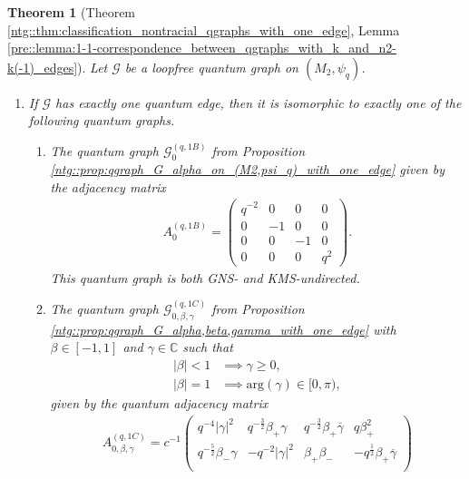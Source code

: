 \documentclass{amsart}
\newtheorem{thm}{Theorem}[section]
\newcommand{\C}{\mathbb{C}}
\begin{document}
\begin{thm}[Theorem \ref{ntg::thm:classification_nontracial_qgraphs_with_one_edge}, Lemma \ref{pre::lemma:1-1-correspondence_between_qgraphs_with_k_and_n2-k(-1)_edges}]
    Let $\mathcal{G}$ be a loopfree quantum graph on $(M_2, \psi_q)$.
    \begin{enumerate}
        \item If $\mathcal{G}$ has exactly one quantum edge, then it is isomorphic to exactly one of the following quantum graphs.
        \begin{enumerate}
            \item The quantum graph $\mathcal{G}_{0}^{(q,1B)}$ from Proposition \ref{ntg::prop:qgraph_G_alpha_on_(M2,psi_q)_with_one_edge} given by the adjacency matrix 
            \begin{align*}
                A_{0}^{(q,1B)} = \begin{pmatrix}
                    q^{-2} & 0 & 0 & 0 \\
                    0 & -1 & 0 & 0 \\
                    0 & 0 & -1 & 0 \\
                    0 & 0 & 0 & q^{2}
                \end{pmatrix}.
            \end{align*}
            This quantum graph is both GNS- and KMS-undirected.
            \item The quantum graph $\mathcal{G}_{0, \beta, \gamma}^{(q,1C)}$ from Proposition \ref{ntg::prop:qgraph_G_alpha,beta,gamma_with_one_edge} with $\beta \in [-1,1]$ and $\gamma \in \C$ such that  
            \begin{align*}
                |\beta| < 1 & \implies   \gamma \geq 0, \\
                |\beta| = 1 & \implies   \mathrm{arg}(\gamma) \in [0, \pi),
            \end{align*}
            given by the quantum adjacency matrix
            \begin{align*}
                A_{0, \beta, \gamma}^{(q,1C)} = c^{-1} \begin{pmatrix}
                    q^{-4} |\gamma|^2     & q^{-\frac{3}{2}} \beta_+ \gamma            & q^{-\frac{3}{2}}\beta_+ \overline{\gamma}              & q \beta_+^2            \\
                    q^{-\frac{5}{2}} \beta_- \gamma & - q^{-2} |\gamma|^2 & \beta_+ \beta_-                           & -q^{\frac{1}{2}}\beta_+ \overline{\gamma}   \\

\end{pmatrix}
\end{align*}
\end{enumerate}
\end{enumerate}
\end{thm}
\end{document}
